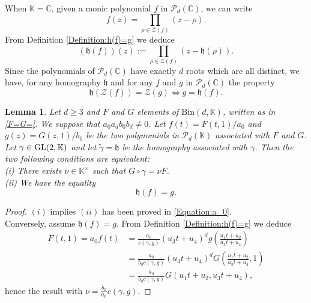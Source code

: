 \documentclass[10pt]{article}
\newtheorem{lemma}[theorem]{Lemma}
\theoremstyle{definition}
\numberwithin{equation}{section}
\newcommand {\C}{{\mathbb{C}}}
\newcommand {\K}{{\mathbb{K}}}
\newcommand{\Bin}{\mathrm {Bin}}
\begin{document}
 
When $\K=\C$, given a monic polynomial $f$ in $\mathcal P_d(\C)$, we can write 
 \[
f(z)=\prod_{\rho \in \mathcal Z(f)} (z-\rho).
 \] 
From Definition \ref{Definition:h(f)=g} we deduce
\begin{equation}\label{defmathfrakh}
\left(\mathfrak h (f) \right) (z) :=\prod_{\rho \in \mathcal Z (f)} \left( z-\mathfrak h (\rho)\right).
\end{equation}
 Since the polynomials of $\mathcal P_d (\C)$ have exactly $d$ roots which are all distinct, we have, for any homography $\mathfrak h$ and for any $f$ and $g$ in $\mathcal P_d (\C)$ the property
 \[%
 \mathfrak h (\mathcal Z (f)) =\mathcal Z (g) \iff g =\mathfrak h (f).
\]%
 

 
 
 \begin{lemma} \label{Lemma0.2} Let $d\geqslant 3$ and $F$ and $G$ elements of $\Bin (d, \K)$, written as in \eqref{F=G=}.
 We suppose that $a_0a_db_0b_d \neq 0$. Let $f(t)= F(t,1)/a_0$ and $g(z) = G(z,1)/b_0 $ be the two polynomials in $\mathcal P_d (\K)$ associated with $F$ and $G$. Let $\gamma \in {\rm GL}(2, \K)$ and let $\tilde \gamma= \mathfrak h$ be the homography associated with $\gamma$. Then the two following conditions are equivalent:
 \\
 (i) There exists $\nu\in\K^\times$ such that $G\circ \gamma=\nu F$.
 \\
 (ii) We have the equality
\[
 \mathfrak h (f) =g.
\] 
 \end{lemma}
 
 \begin{proof} 
 $(i)$ implies $(ii)$ has been proved in \eqref{Equation:a_0}.
\\
 Conversely, assume $ \mathfrak h (f) =g$. From Definition \ref{Definition:h(f)=g} we deduce 
 \[
 \begin{aligned}
 F(t,1)=a_0f(t)&=  \frac{a_0}{ c(\gamma,g)}(u_3t+u_4)^dg\left(\frac{u_1t+u_2}{u_3t+u_4}\right)
 \\
 &=\frac {a_0}{b_0 c(\gamma,g)}(u_3t+u_4)^dG\left(\frac{u_1t+u_2}{u_3t+u_4},1\right)
 \\
 &=\frac {a_0}{b_0 c(\gamma,g)}G(u_1t+u_2, u_3t+u_4),
 \end{aligned}
\]
 hence the result with $\nu=\frac{b_0 }{a_0}c(\gamma,g)$.
 \end{proof}
 
\end{document}
